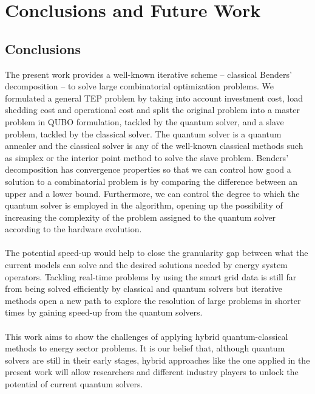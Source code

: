 
\chapter{Conclusions and Future Work} %

\label{Chapter6} %




\section{Conclusions}
The present work provides a well-known iterative scheme -- classical Benders' decomposition -- to solve large combinatorial optimization problems. We formulated a general TEP problem by taking into account investment cost, load shedding cost and operational cost and split the original problem into a master problem in QUBO formulation, tackled by the quantum solver, and a slave problem, tackled by the classical solver. The quantum solver is a quantum annealer and the classical solver is any of the well-known classical methods such as simplex or the interior point method to solve the slave problem. Benders' decomposition has convergence properties so that we can control how good a solution to a combinatorial problem is by comparing the difference between an upper and a lower bound. Furthermore, we can control the degree to which the quantum solver is employed in the algorithm, opening up the possibility of increasing the complexity of the problem assigned to the quantum solver according to the hardware evolution.\\\\
The potential speed-up would help to close the granularity gap between what the current models can solve and the desired solutions needed by energy system operators. Tackling real-time problems by using the smart grid data is still far from being solved efficiently by classical and quantum solvers but iterative methods open a new path to explore the resolution of large problems in shorter times by gaining speed-up from the quantum solvers.\\\\
This work aims to show the challenges of applying hybrid quantum-classical methods to energy sector problems. It is our belief that, although quantum solvers are still in their early stages, hybrid approaches like the one applied in the present work will allow researchers and different industry players to unlock the potential of current quantum solvers.
